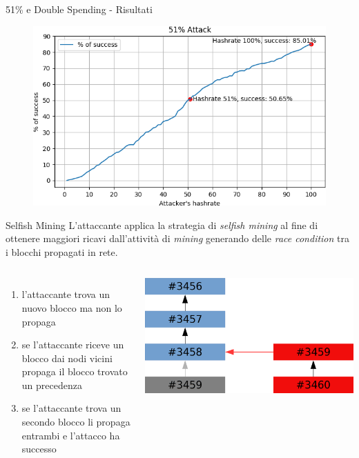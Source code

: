 \documentclass{beamer}
\begin{document}
\begin{frame}{51\% e Double Spending - Risultati}
	\begin{figure}
		\centering
        \includegraphics[width=\linewidth]{./images/51-v3.png}
	\end{figure}
\end{frame}

\begin{frame}{Selfish Mining}
	L'attaccante applica la strategia di \textit{selfish mining} al fine di ottenere maggiori ricavi dall'attività di \textit{mining} generando delle \textit{race condition} tra i blocchi propagati in rete.
    \begin{columns}
    		\begin{enumerate}
    			\item l'attaccante trova un nuovo blocco ma non lo propaga
                \item se l'attaccante riceve un blocco dai nodi vicini propaga il blocco trovato un precedenza
                \item se l'attaccante trova un secondo blocco li propaga entrambi e l'attacco ha successo
    		\end{enumerate}
            
			\includegraphics[width=\linewidth]{./images/selfish.png}
	\end{columns}
\end{frame}
\end{document}
